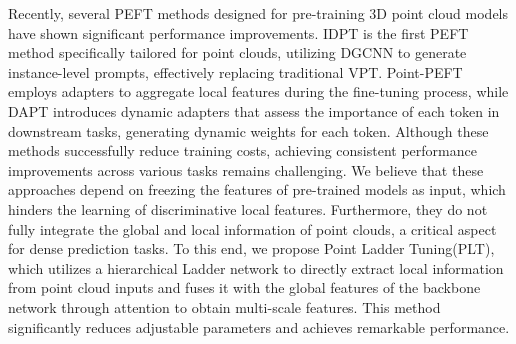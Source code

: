 Recently, several PEFT methods\cite{zha2023instance,tang2024point,zhou2024dynamic,liang2024parameter,zhang2024positional} designed for pre-training 3D point cloud models have shown significant performance improvements. IDPT\cite{zha2023instance} is the first PEFT method specifically tailored for point clouds, utilizing DGCNN\cite{wang2019dynamic} to generate instance-level prompts, effectively replacing traditional VPT. Point-PEFT\cite{tang2024point} employs adapters to aggregate local features during the fine-tuning process, while DAPT\cite{zhou2024dynamic} introduces dynamic adapters that assess the importance of each token in downstream tasks, generating dynamic weights for each token. Although these methods successfully reduce training costs, achieving consistent performance improvements across various tasks remains challenging. We believe that these approaches depend on freezing the features of pre-trained models as input, which hinders the learning of discriminative local features. Furthermore, they do not fully integrate the global and local information of point clouds, a critical aspect for dense prediction tasks\cite{chen2022vitadapter}. To this end, we propose Point Ladder Tuning(PLT), which utilizes a hierarchical Ladder network to directly extract local information from point cloud inputs and fuses it with the global features of the backbone network through attention to obtain multi-scale features. This method significantly reduces adjustable parameters and achieves remarkable performance.
